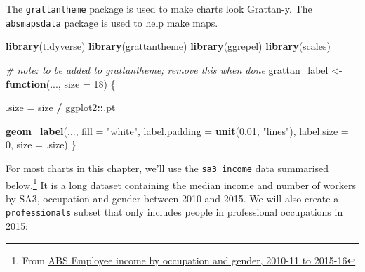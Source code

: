 \documentclass[]{book}
\newenvironment{Shaded}{\begin{snugshade}}{\end{snugshade}}
\newcommand{\CommentTok}[1]{\textcolor[rgb]{0.56,0.35,0.01}{\textit{#1}}}
\newcommand{\ControlFlowTok}[1]{\textcolor[rgb]{0.13,0.29,0.53}{\textbf{#1}}}
\newcommand{\DataTypeTok}[1]{\textcolor[rgb]{0.13,0.29,0.53}{#1}}
\newcommand{\DecValTok}[1]{\textcolor[rgb]{0.00,0.00,0.81}{#1}}
\newcommand{\FloatTok}[1]{\textcolor[rgb]{0.00,0.00,0.81}{#1}}
\newcommand{\KeywordTok}[1]{\textcolor[rgb]{0.13,0.29,0.53}{\textbf{#1}}}
\newcommand{\NormalTok}[1]{#1}
\newcommand{\OperatorTok}[1]{\textcolor[rgb]{0.81,0.36,0.00}{\textbf{#1}}}
\newcommand{\StringTok}[1]{\textcolor[rgb]{0.31,0.60,0.02}{#1}}
\begin{document}
The \texttt{grattantheme} package is used to make charts look Grattan-y. The \texttt{absmapsdata} package is used to help make maps.

\begin{Shaded}
\begin{Highlighting}[]
\KeywordTok{library}\NormalTok{(tidyverse)}
\KeywordTok{library}\NormalTok{(grattantheme)}
\KeywordTok{library}\NormalTok{(ggrepel)}
\KeywordTok{library}\NormalTok{(scales)}
\end{Highlighting}
\end{Shaded}

\begin{Shaded}
\begin{Highlighting}[]
\CommentTok{# note: to be added to grattantheme; remove this when done}
\NormalTok{grattan_label <-}\StringTok{ }\ControlFlowTok{function}\NormalTok{(..., }\DataTypeTok{size =} \DecValTok{18}\NormalTok{) \{}

\NormalTok{  .size =}\StringTok{ }\NormalTok{size }\OperatorTok{/}\StringTok{ }\NormalTok{ggplot2}\OperatorTok{::}\NormalTok{.pt}
  
\KeywordTok{geom_label}\NormalTok{(..., }
           \DataTypeTok{fill =} \StringTok{"white"}\NormalTok{,}
           \DataTypeTok{label.padding =} \KeywordTok{unit}\NormalTok{(}\FloatTok{0.01}\NormalTok{, }\StringTok{"lines"}\NormalTok{), }
           \DataTypeTok{label.size =} \DecValTok{0}\NormalTok{,}
           \DataTypeTok{size =}\NormalTok{ .size)}
\NormalTok{\}}
\end{Highlighting}
\end{Shaded}

For most charts in this chapter, we'll use the \texttt{sa3\_income} data summarised below.\footnote{From \href{https://www.abs.gov.au/AUSSTATS/abs@.nsf/DetailsPage/6524.0.55.0022011-2016?OpenDocument}{ABS Employee income by occupation and gender, 2010-11 to 2015-16}} It is a long dataset containing the median income and number of workers by SA3, occupation and gender between 2010 and 2015. We will also create a \texttt{professionals} subset that only includes people in professional occupations in 2015:
\end{document}
